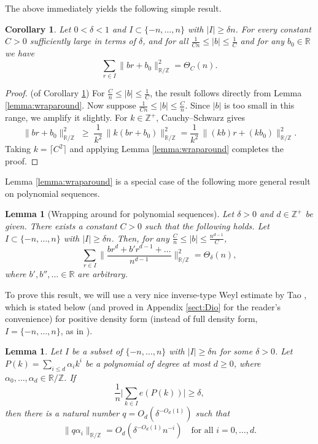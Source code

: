 \documentclass[reqno]{amsart}
\newcommand\R{{\mathbb{R}}}
\newcommand\Z{{\mathbb{Z}}}
\theoremstyle{plain}
\newtheorem{lemma}[theorem]{Lemma}
\newtheorem{corollary}[theorem]{Corollary}
\theoremstyle{definition}
\begin{document}
The above immediately yields the following simple result.

\begin{corollary}\label{cor:wraparound} 
Let $0 < \delta < 1$ and $I \subset \{-n,\dots,n\}$ with $|I| \geq \delta n$. For every constant $C > 0$ sufficiently large in terms of $\delta$, and for all $\frac{1}{Cn} \leq |b| \leq \frac{1}{C}$ and for any $b_0 \in \R$ we have
$$\sum_{r \in I} \| b r +b_0 \|_{\R/\Z}^2 =\Theta_{C} (n).$$
\end{corollary}

\begin{proof}(of Corollary \ref{cor:wraparound})
For $\tfrac{C}{n} \le |b| \le \tfrac{1}{C}$, the result follows directly from Lemma \ref{lemma:wraparound}. Now suppose $\tfrac{1}{Cn} \le |b| \le \tfrac{C}{n}$. Since $|b|$ is too small in this range, we amplify it slightly. For $k \in \Z^{+}$, Cauchy--Schwarz gives
\[
\| br+b_0 \|_{\R/\Z}^{2} \;\ge\; \frac{1}{k^{2}} \, \| k (b r+b_0) \|_{\R/\Z}^{2}=\frac{1}{k^{2}} \, \| (kb)r+(kb_0) \|_{\R/\Z}^{2}.
\]
Taking $k = \lceil C^{2} \rceil$ and applying Lemma \ref{lemma:wraparound} completes the proof.
\end{proof}

Lemma \ref{lemma:wraparound} is a special case of the following more general result on polynomial sequences.

\begin{lemma}[Wrapping around for polynomial sequences]\label{lemma:wraparound:square}
Let $\delta > 0$ and $d \in \Z^+$ be given. There exists a constant $C>0$ such that the following holds. Let $I \subset \{-n,\dots,n\}$ with $|I| \geq \delta n$. Then, for any $\frac{C}{n} \leq |b| \leq \frac{n^{d-1}}{C}$,
\[
\sum_{r \in I} \Big\| \frac{b r^d + b' r^{d-1} + \dots}{n^{d-1}} \Big\|_{\R/\Z}^2 =\Theta_{\delta}(n),
\]
where $b', b'', \dots \in \R$ are arbitrary.
\end{lemma}


To prove this result, we will use a very nice inverse-type Weyl estimate by Tao \cite[Corollary 5]{Tao}, which is stated below (and proved in Appendix \ref{sect:Dio} for the reader's convenience) for positive density form
(instead of full density form, $I=\{-n,\ldots,n\}$, as in \cite{Tao}).

\begin{lemma}\label{lemma:Weyl:inverse}  Let $I$ be a subset of $\{-n,\dots, n\}$ with $|I|\ge \delta n$ for some $\delta>0$. Let $P(k) = \sum_{i \leq d} \alpha_i k^i$
be a polynomial of degree at most $d \geq 0$, where $\alpha_0,\dots,\alpha_d \in \R/\Z$. If
\[
\frac{1}{n} \Big| \sum_{k \in I} e(P(k)) \Big| \geq \delta,
\]
then there is a natural number $q= O_d(\delta^{-O_d(1)})$ such that
\[
\| q\alpha_i \|_{\R/\Z} =O_d(\delta^{-O_d(1)} n^{-i})
\quad \text{for all } i=0,\dots,d.
\]
\end{lemma}
\end{document}
